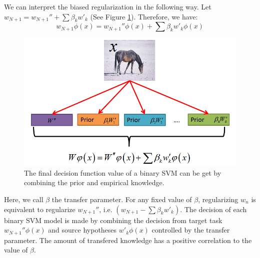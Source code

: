 We can interpret the biased regularization in the following way. Let $w_{N+1} = w_{N+1}''+\sum\limits{\beta _kw'_k}$ (See Figure \ref{fig:combine}). Therefore, we have:
\begin{equation*}
w_{N+1}\phi(x)=w_{N+1}''\phi(x)+\sum\limits{\beta _kw'_k\phi(x)}
\end{equation*}

\begin{figure}
\centering
\includegraphics[scale=0.25]{fig/combine.png}
\caption{The final decision function value of a binary SVM can be get by combining the prior and empirical knowledge.}\label{fig:combine}
\end{figure}
Here, we call $\beta$ the transfer parameter. For any fixed value of $\beta$, regularizing $w_n$ is equivalent to regularize $w_{N+1}''$, i.e. $(w_{N+1}-\sum\limits{\beta _kw'_k})$. The decision of each binary SVM model is made by combining the decision from target task $w_{N+1}''\phi(x)$ and source hypotheses $w'_k\phi(x)$ controlled by the transfer parameter. The amount of transfered knowledge has a positive correlation to the value of $\beta$.